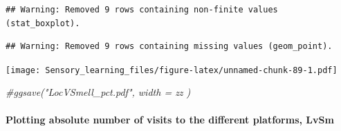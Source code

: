 \documentclass[]{article}
\newenvironment{Shaded}{\begin{snugshade}}{\end{snugshade}}
\newcommand{\CommentTok}[1]{\textcolor[rgb]{0.56,0.35,0.01}{\textit{{#1}}}}
\let\oldparagraph\paragraph
\renewcommand{\paragraph}[1]{\oldparagraph{#1}\mbox{}}
\begin{document}
\begin{verbatim}
## Warning: Removed 9 rows containing non-finite values (stat_boxplot).
\end{verbatim}

\begin{verbatim}
## Warning: Removed 9 rows containing missing values (geom_point).
\end{verbatim}

\texttt{[image: Sensory\_learning\_files/figure-latex/unnamed-chunk-89-1.pdf]}

\begin{Shaded}
\begin{Highlighting}[]
\CommentTok{#ggsave("LocVSmell_pct.pdf", width = zz )}
\end{Highlighting}
\end{Shaded}

\paragraph{Plotting absolute number of visits to the different
platforms,
LvSm}\label{plotting-absolute-number-of-visits-to-the-different-platforms-lvsm-1}
\end{document}
